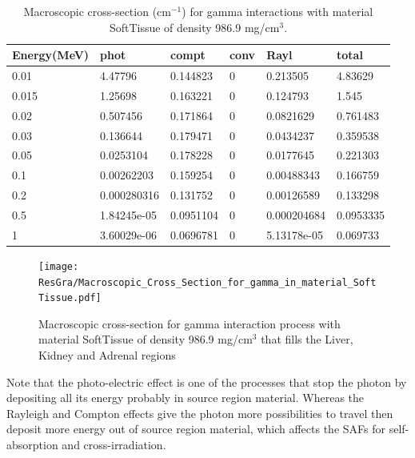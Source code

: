 \documentclass[letterpaper,12pt]{article}
\begin{document}
\begin{table}[H] 
\centering 
\caption{Macroscopic cross-section (cm$^{-1}$) for gamma interactions with material SoftTissue of density 986.9 mg/cm$^3$.} 
\begin{tabular}{llllll} \hline 
\textbf{Energy(MeV)}           & \textbf{phot}           & \textbf{compt}           & \textbf{conv}           & \textbf{Rayl}           & \textbf{total}                  \\\hline
0.01      & 4.47796      & 0.144823      & 0      & 0.213505      & 4.83629             \\\hline
0.015      & 1.25698      & 0.163221      & 0      & 0.124793      & 1.545             \\\hline
0.02      & 0.507456      & 0.171864      & 0      & 0.0821629      & 0.761483             \\\hline
0.03      & 0.136644      & 0.179471      & 0      & 0.0434237      & 0.359538             \\\hline
0.05      & 0.0253104      & 0.178228      & 0      & 0.0177645      & 0.221303             \\\hline
0.1      & 0.00262203      & 0.159254      & 0      & 0.00488343      & 0.166759             \\\hline
0.2      & 0.000280316      & 0.131752      & 0      & 0.00126589      & 0.133298             \\\hline
0.5      & 1.84245e-05      & 0.0951104      & 0      & 0.000204684      & 0.0953335             \\\hline
1      & 3.60029e-06      & 0.0696781      & 0      & 5.13178e-05      & 0.069733      \\ \hline
\end{tabular} 
\label{CrossSectioPerVolumeInMaterialSoftTissueTable}
\end{table}

\begin{figure}[H] 
    \texttt{[image: ResGra/Macroscopic\_Cross\_Section\_for\_gamma\_in\_material\_SoftTissue.pdf]}
    \centering
	\caption{Macroscopic cross-section for gamma interaction process with material SoftTissue of density 986.9 mg/cm$^3$ that fills the Liver, Kidney and Adrenal regions} 
	\label{CrossSectioPerVolumeInMaterialSoftTissueGraph}
\end{figure}

Note that the photo-electric effect is one of the processes that stop the photon by depositing all its energy probably in source region material. Whereas the Rayleigh and Compton effects give the photon more possibilities to travel then deposit more energy out of source region material, which affects the SAFs for self-absorption and cross-irradiation.
\end{document}

